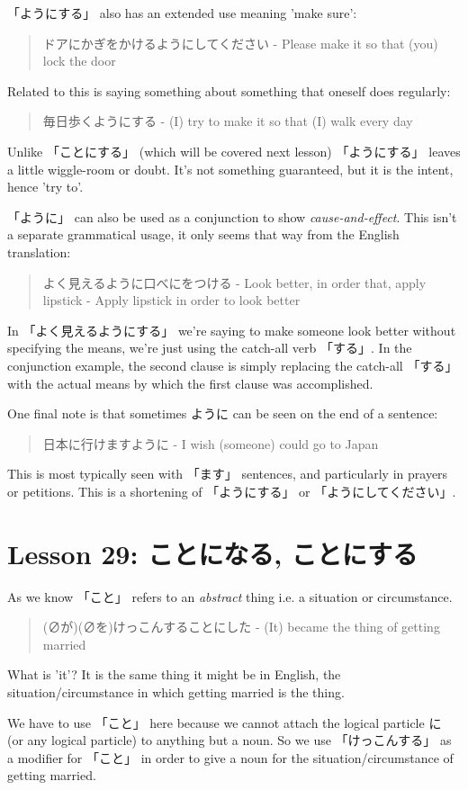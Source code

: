 \documentclass[11pt]{article}
\begin{document}
「ようにする」 also has an extended use meaning 'make sure':
\begin{quote}
ドアにかぎをかけるようにしてください - Please make it so that (you) lock the door
\end{quote}
Related to this is saying something about something that oneself does regularly:
\begin{quote}
毎日歩くようにする - (I) try to make it so that (I) walk every day
\end{quote}
Unlike 「ことにする」 (which will be covered next lesson) 「ようにする」 leaves a little wiggle-room or doubt. It's not something guaranteed, but it is the intent, hence 'try to'.

「ように」 can also be used as a conjunction to show \emph{cause-and-effect}. This isn't a separate grammatical usage, it only seems that way from the English translation:
\begin{quote}
よく見えるように口べにをつける - Look better, in order that, apply lipstick - Apply lipstick in order to look better
\end{quote}
In 「よく見えるようにする」 we're saying to make someone look better without specifying the means, we're just using the catch-all verb 「する」. In the conjunction example, the second clause is simply replacing the catch-all 「する」 with the actual means by which the first clause was accomplished.

One final note is that sometimes ように can be seen on the end of a sentence:
\begin{quote}
日本に行けますように - I wish (someone) could go to Japan
\end{quote}
This is most typically seen with 「ます」 sentences, and particularly in prayers or petitions. This is a shortening of 「ようにする」 or 「ようにしてください」.
\section{Lesson 29: ことになる, ことにする}
\label{sec:orge1f6a2f}
As we know 「こと」 refers to an \emph{abstract} thing i.e. a situation or circumstance.
\begin{quote}
(∅が)(∅を)けっこんすることにした - (It) became the thing of getting married
\end{quote}
What is 'it'? It is the same thing it might be in English, the situation/circumstance in which getting married is the thing.

We have to use 「こと」 here because we cannot attach the logical particle に (or any logical particle) to anything but a noun. So we use 「けっこんする」 as a modifier for 「こと」 in order to give a noun for the situation/circumstance of getting married.
\end{document}
